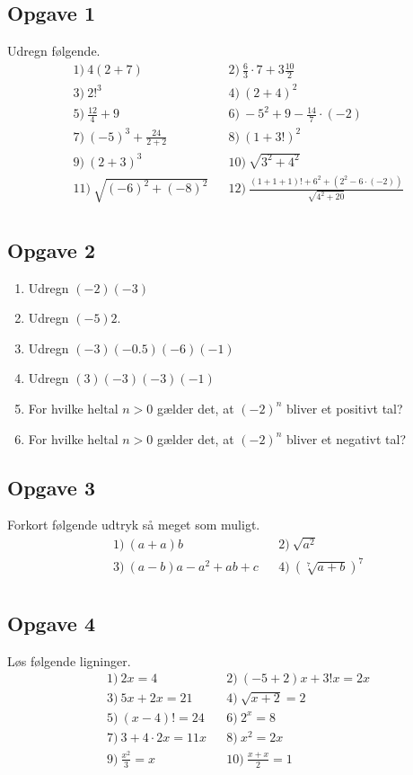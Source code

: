 \subsection*{Opgave 1}
Udregn følgende. 
\begin{align*}
	&1) \ 4(2+7)   &&2) \   \frac{6}{3}\cdot 7+3\frac{10}{2}  \\
	&3) \ 2!^3   &&4) \  (2+4)^2   \\
	&5) \  \frac{12}{4} +9 &&6) \  -5^2+9-\frac{14}{7}\cdot(-2)   \\
	&7) \ (-5)^3+\frac{24}{2+2}    &&8) \  (1+3!)^2   \\
	&9) \  (2+3)^3  &&10) \  \sqrt{3^2+4^2}   \\
	&11) \ \sqrt{(-6)^2+(-8)^2}   &&12) \  \frac{(1+1+1)!+6^2 + (2^2-6\cdot(-2))}{\sqrt{4^2+20}}   \\
\end{align*}

\subsection*{Opgave 2}

\begin{enumerate}[label=\roman*)]
	\item Udregn $(-2)(-3)$
	\item Udregn $(-5)2$.
	\item Udregn $(-3)(-0.5)(-6)(-1)$
	\item Udregn $(3)(-3)(-3)(-1)$
	\item For hvilke heltal $n>0$ gælder det, at $(-2)^n$ bliver et positivt tal?
	\item For hvilke heltal $n>0$ gælder det, at $(-2)^n$ bliver et negativt tal?
\end{enumerate}



\subsection*{Opgave 3}
Forkort følgende udtryk så meget som muligt.
\begin{align*}
	&1) \  (a+a)b  &&2) \  \sqrt{a^2}   \\
	&3) \  (a-b)a-a^2+ab+c  &&4) \ (\sqrt[7]{a+b})^7    \\
\end{align*}


\subsection*{Opgave 4}
Løs følgende ligninger.	
\begin{align*}
	&1) \  2x = 4  &&2) \ (-5+2)x+3!x = 2x   \\
	&3) \  5x+2x = 21  &&4) \ \sqrt{x+2} = 2   \\
	&5) \  (x-4)! = 24  &&6) \  2^x = 8  \\
	&7) \  3+4\cdot 2x = 11x  &&8) \ x^2 = 2x   \\
	&9) \  \frac{x^2}{3} = x  &&10) \  \frac{x+x}{2} = 1  \\	
\end{align*}


